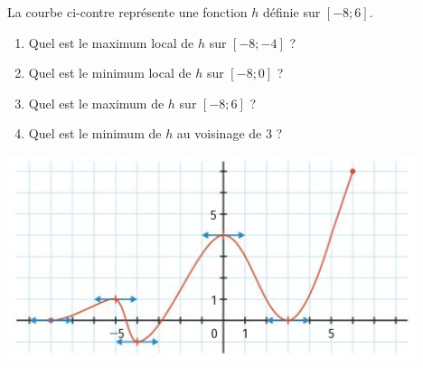 \documentclass[11pt]{article}
\begin{document}
\begin{app}
  \begin{minipage}[]{.5\textwidth}
    La courbe ci-contre représente une fonction $h$ définie sur $\left[ -8; 6
    \right]$.
    \begin{enumerate}
      \item Quel est le maximum local de $h$ sur $\left[ -8; -4 \right]$ ?
      \item Quel est le minimum local de $h$ sur $\left[ -8; 0 \right]$ ?
      \item Quel est le maximum de $h$ sur $\left[ -8; 6 \right]$ ?
      \item Quel est le minimum de $h$ au voisinage de $3$ ?
    \end{enumerate}
  \end{minipage}
  \begin{minipage}[]{.5\textwidth}
    \begin{center}
      \includegraphics[scale=.5]{app-extremums.png}
    \end{center}
  \end{minipage}
\end{app}
\end{document}
